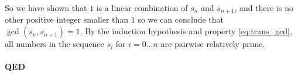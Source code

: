 \documentclass[fleqn]{article}
\begin{document}
\noindent
So we have shown that $1$ is a linear combination of $s_n$ and $s_{n+1}$, and there is no other positive integer smaller than $1$ so we can conclude that $\gcd\left(s_n, s_{n+1}\right)=1$.  By the induction hypothesis and property \ref{eq:trans_gcd}, all numbers in the sequence $s_{i}$ for $i=0 \dots n$ are pairwise relatively prime.

\paragraph{QED}
\end{document}

